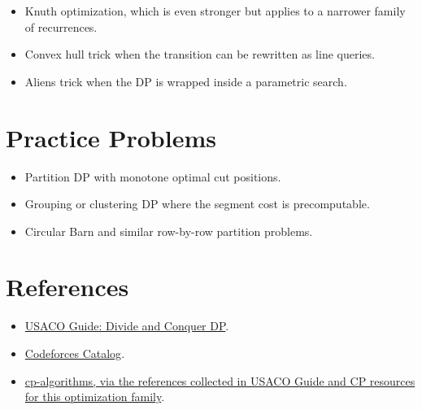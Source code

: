 \begin{itemize}
  \item Knuth optimization, which is even stronger but applies to a narrower family of recurrences.
  \item Convex hull trick when the transition can be rewritten as line queries.
  \item Aliens trick when the DP is wrapped inside a parametric search.
\end{itemize}

\section*{Practice Problems}

\begin{itemize}
  \item Partition DP with monotone optimal cut positions.
  \item Grouping or clustering DP where the segment cost is precomputable.
  \item Circular Barn and similar row-by-row partition problems.
\end{itemize}

\section*{References}

\begin{itemize}
  \item \href{https://usaco.guide/plat/DC-DP}{USACO Guide: Divide and Conquer DP}.
  \item \href{https://codeforces.com/catalog?locale=en}{Codeforces Catalog}.
  \item \href{https://cp-algorithms.com/}{cp-algorithms, via the references collected in USACO Guide and CP resources for this optimization family}.
\end{itemize}
